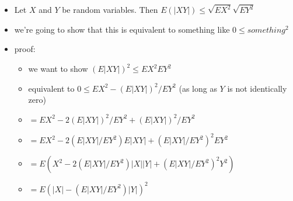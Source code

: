 \documentclass[11pt]{article}
\begin{document}
\begin{itemize}
\item Let $X$ and $Y$ be random variables.  Then $E (|X Y|) \leq
          \sqrt{E X^2} \sqrt{E Y^2}$
\item we're going to show that this is equivalent to something
          like $0 \leq something^2$
\item proof:
\begin{itemize}
\item we want to show $(E |XY|)^2 \leq E X^2 E Y^2$
\item equivalent to $0 \leq E X^2 - (E |X Y|)^2 / E Y^2$ (as long
            as $Y$ is not identically zero)
\item $= E X^2 - 2 (E |XY|)^2/EY^2 + (E |XY|)^2/EY^2$
\item $= E X^2 - 2(E |XY| / E Y^2) E |XY| + (E |XY|/EY^2)^2 E Y^2$
\item $= E(X^2 - 2(E |XY| / E Y^2) |X| |Y| + (E |XY|/EY^2)^2 Y^2)$
\item $= E(|X| - (E |XY|/E Y^2) |Y|)^2$
\end{itemize}
\end{itemize}
\end{document}
